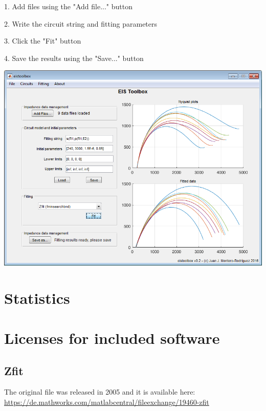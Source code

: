 \documentclass[10pt,a4paper]{article}
\begin{document}
1. Add files using the "Add file..." button

2. Write the circuit string and fitting parameters

3. Click the "Fit" button

4. Save the results using the "Save..." button

\includegraphics[width=15cm]{main_screenshot.png}



\newpage
\section{Statistics}


\newpage{}
\section{Licenses for included software}

\subsection{Zfit}

The original file was released in 2005 and it is available here:\\

\url{https://de.mathworks.com/matlabcentral/fileexchange/19460-zfit}
\end{document}
